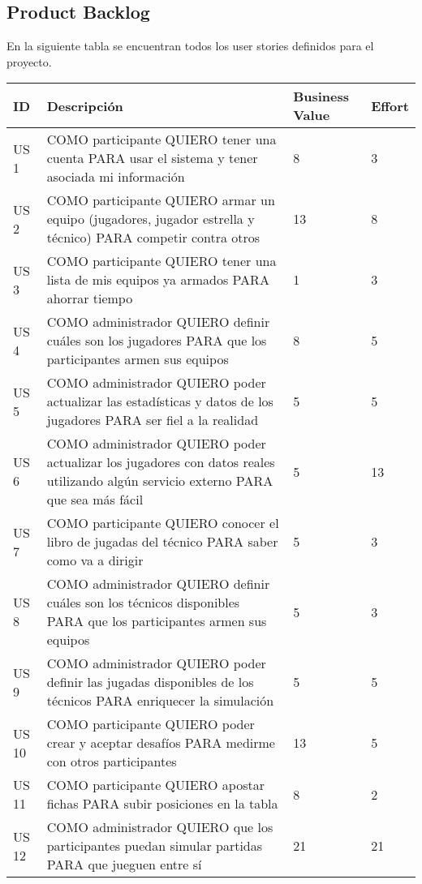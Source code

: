 \subsection{Product Backlog}
\indent En la siguiente tabla se encuentran todos los user stories definidos para el proyecto.\\

\begin{center}
  \begin{tabular}{| l | p{10cm} | l | l | }
    \hline
ID & Descripción & Business Value & Effort\\  \hline
US 1 & COMO participante QUIERO tener una cuenta PARA usar el sistema y tener asociada mi información & 8 & 3\\  \hline
US 2 & COMO participante QUIERO armar un equipo (jugadores, jugador estrella y técnico) PARA competir contra otros & 13 & 8\\  \hline
US 3 & COMO participante QUIERO tener una lista de mis equipos ya armados PARA ahorrar tiempo & 1 & 3\\  \hline
US 4 & COMO administrador QUIERO definir cuáles son los jugadores PARA que los participantes armen sus equipos & 8 & 5\\  \hline
US 5 & COMO administrador QUIERO poder actualizar las estadísticas y datos de los jugadores PARA ser fiel a la realidad & 5 & 5\\  \hline
US 6 & COMO administrador QUIERO poder actualizar los jugadores con datos reales utilizando algún servicio externo PARA que sea más fácil & 5 & 13\\  \hline
US 7 & COMO participante QUIERO conocer el libro de jugadas del técnico PARA saber como va a dirigir & 5 & 3\\  \hline
US 8 & COMO administrador QUIERO definir cuáles son los técnicos disponibles PARA que los participantes armen sus equipos & 5 & 3\\  \hline
US 9 & COMO administrador QUIERO poder definir las jugadas disponibles de los técnicos PARA enriquecer la simulación & 5 & 5\\  \hline
US 10 & COMO participante QUIERO poder crear y aceptar desafíos PARA medirme con otros participantes & 13 & 5\\  \hline
US 11 & COMO participante QUIERO apostar fichas PARA subir posiciones en la tabla & 8 & 2\\  \hline
US 12 & COMO administrador QUIERO que los participantes puedan simular partidas PARA que jueguen entre sí & 21 & 21\\  \hline

\end{tabular}
\end{center}
